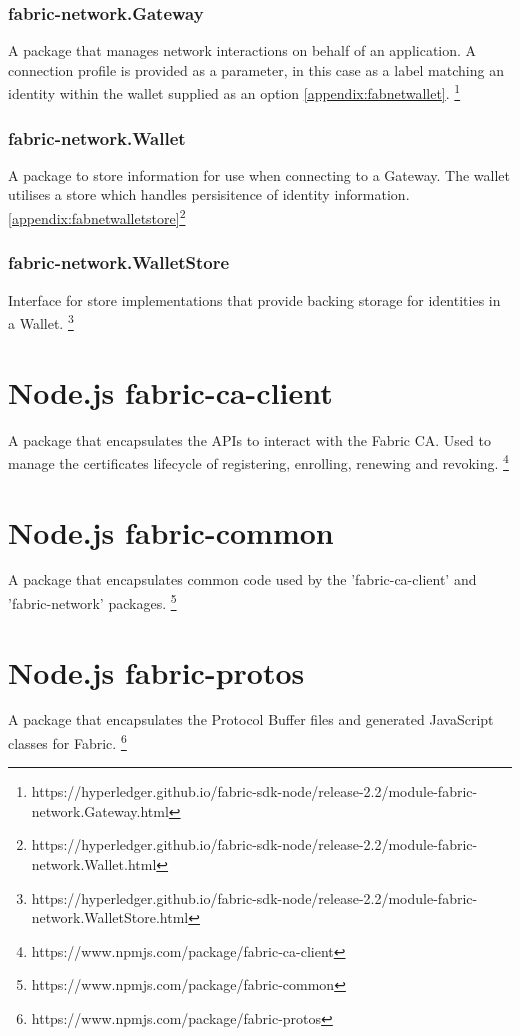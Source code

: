 \subsubsection{fabric-network.Gateway}
A package that manages network interactions on behalf of an application. A connection profile is provided as a parameter, in this case as a label matching an identity within the wallet supplied as an option \ref{appendix:fabnetwallet}. \footnote{https://hyperledger.github.io/fabric-sdk-node/release-2.2/module-fabric-network.Gateway.html} \label{appendix:fabnetgate}

\subsubsection{fabric-network.Wallet}
A package to store information for use when connecting to a Gateway. The wallet utilises a store which handles persisitence of identity information. \ref{appendix:fabnetwalletstore}\footnote{https://hyperledger.github.io/fabric-sdk-node/release-2.2/module-fabric-network.Wallet.html} \label{appendix:fabnetwallet}

\subsubsection{fabric-network.WalletStore}
Interface for store implementations that provide backing storage for identities in a Wallet. \footnote{https://hyperledger.github.io/fabric-sdk-node/release-2.2/module-fabric-network.WalletStore.html} \label{appendix:fabnetwalletstore}

\section{Node.js fabric-ca-client}
A package that encapsulates the APIs to interact with the Fabric CA. Used to manage the certificates lifecycle of registering, enrolling, renewing and revoking. \footnote{https://www.npmjs.com/package/fabric-ca-client} \label{appendix:nodeca}

\section{Node.js fabric-common}
A package that encapsulates common code used by the 'fabric-ca-client' and 'fabric-network' packages. \footnote{https://www.npmjs.com/package/fabric-common} \label{appendix:fabcommon}

\section{Node.js fabric-protos}
A package that encapsulates the Protocol Buffer files and generated JavaScript classes for Fabric. \footnote{https://www.npmjs.com/package/fabric-protos} \label{appendix:fabprotos}

